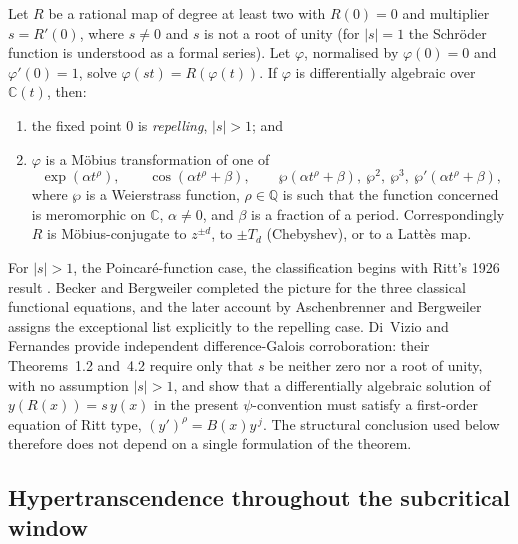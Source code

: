 \begin{theorem}
\label{a:thm:BB-main}
Let $R$ be a rational map of degree at least two with $R(0)=0$ and multiplier $s=R'(0)$, where $s\neq0$ and $s$ is not a root of unity (for $|s|=1$ the Schr\"oder function is understood as a formal series). Let $\varphi$, normalised by $\varphi(0)=0$ and $\varphi'(0)=1$, solve $\varphi(st)=R(\varphi(t))$. If $\varphi$ is differentially algebraic over $\mathbb{C}(t)$, then:
\begin{enumerate}[label=\textup{(\roman*)}]
\item the fixed point $0$ is \emph{repelling}, $|s|>1$; and
\item $\varphi$ is a M\"obius transformation of one of
\[
\exp(\alpha t^{\rho}),
\qquad
\cos(\alpha t^{\rho}+\beta),
\qquad
\wp(\alpha t^{\rho}+\beta),\ \wp^{2},\ \wp^{3},\ \wp'(\alpha t^{\rho}+\beta),
\]
where $\wp$ is a Weierstrass function, $\rho\in\mathbb{Q}$ is such that the function concerned is meromorphic on $\mathbb{C}$, $\alpha\neq0$, and $\beta$ is a fraction of a period. Correspondingly $R$ is M\"obius-conjugate to $z^{\pm d}$, to $\pm T_d$ (Chebyshev), or to a Latt\`es map.
\end{enumerate}
\end{theorem}

\begin{remark}
\label{a:rem:lineage}
For $|s|>1$, the Poincar\'e-function case, the classification begins with Ritt's
1926 result \cite{Ritt1926}.  Becker and Bergweiler completed the picture for the
three classical functional equations, and the later account by Aschenbrenner and
Bergweiler \cite{AschenbrennerBergweiler2015} assigns the exceptional list
explicitly to the repelling case.  Di~Vizio and Fernandes
\cite{DiVizioFernandes2021} provide independent difference-Galois corroboration:
their Theorems~1.2 and~4.2 require only that $s$ be neither zero nor a root of unity,
with no assumption $|s|>1$, and show that a differentially algebraic solution of
$y(R(x))=s\,y(x)$ in the present $\psi$-convention must satisfy a first-order
equation of Ritt type, $(y')^{\rho}=B(x)y^{\,j}$.  The structural conclusion used
below therefore does not depend on a single formulation of the theorem.
\end{remark}

\subsection{Hypertranscendence throughout the subcritical window}

